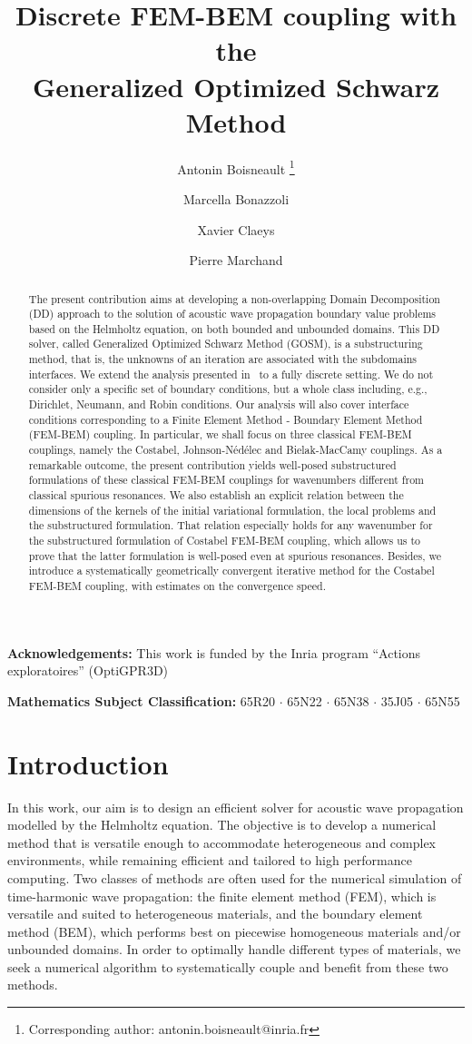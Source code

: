 \documentclass[a4paper,11pt]{article}
\title{\bf Discrete FEM-BEM coupling with the\\
  Generalized Optimized Schwarz Method}
\author[1,2]{Antonin Boisneault\orcidID{0000-0001-7986-9048} \thanks{Corresponding author: antonin.boisneault@inria.fr}}
\author[2]{Marcella Bonazzoli\orcidID{0000-0002-0284-5643}}
\author[1]{Xavier Claeys\orcidID{0000-0003-0826-6244}}
\author[1]{Pierre Marchand\orcidID{0000-0002-2522-6837}}
\affil[1]{{\small POEMS, CNRS, Inria, ENSTA, Institut Polytechnique de
    Paris, 91120 Palaiseau, France} }
\affil[2]{{\small Inria, Unité de Mathématiques Appliquées, ENSTA, Institut
    Polytechnique de Paris, 91120 Palaiseau, France}}
\date{}
\begin{document}
\maketitle

\begin{abstract}
The present contribution aims at developing a non-overlapping Domain
Decomposition (DD) approach to the solution of acoustic wave propagation
boundary value problems based on the Helmholtz equation, on both bounded
and unbounded domains.  This DD solver, called Generalized Optimized
Schwarz Method (GOSM), is a substructuring method, that is, the unknowns of
an iteration are associated with the subdomains interfaces.  We extend the
analysis presented in~\cite{MR4665035} to a fully discrete setting. We do
not consider only a specific set of boundary conditions, but a whole class
including, e.g., Dirichlet, Neumann, and Robin conditions.  Our analysis
will also cover interface conditions corresponding to a Finite Element
Method - Boundary Element Method (FEM-BEM) coupling. In particular, we
shall focus on three classical FEM-BEM couplings, namely the Costabel,
Johnson-N\'ed\'elec and Bielak-MacCamy couplings.  As a remarkable outcome,
the present contribution yields well-posed substructured formulations of
these classical FEM-BEM couplings for wavenumbers different from classical
spurious resonances. We also establish an explicit relation between the
dimensions of the kernels of the initial variational formulation, the local
problems and the substructured formulation. That relation especially holds
for any wavenumber for the substructured formulation of Costabel FEM-BEM
coupling, which allows us to prove that the latter formulation is
well-posed even at spurious resonances.  Besides, we introduce a
systematically geometrically convergent iterative method for the Costabel
FEM-BEM coupling, with estimates on the convergence speed.
\end{abstract}

\noindent\textbf{Acknowledgements:}{ \small This work is funded by the Inria program “Actions exploratoires” (OptiGPR3D)}

\noindent\textbf{Mathematics Subject Classification:}{ 65R20 \(\cdot\) 65N22 \(\cdot\) 65N38 \(\cdot\) 35J05 \(\cdot\) 65N55}

\section*{Introduction}

In this work, our aim is to design an efficient solver for acoustic wave
propagation modelled by the Helmholtz equation. The objective is to develop
a numerical method that is versatile enough to accommodate heterogeneous
and complex environments, while remaining efficient and tailored to high
performance computing.  Two classes of methods are often used for the
numerical simulation of time-harmonic wave propagation: the finite element
method (FEM), which is versatile and suited to heterogeneous materials, and
the boundary element method (BEM), which performs best on piecewise
homogeneous materials and/or unbounded domains. In order to optimally handle
different types of materials, we seek a numerical algorithm to
systematically couple and benefit from these two methods.
\end{document}
